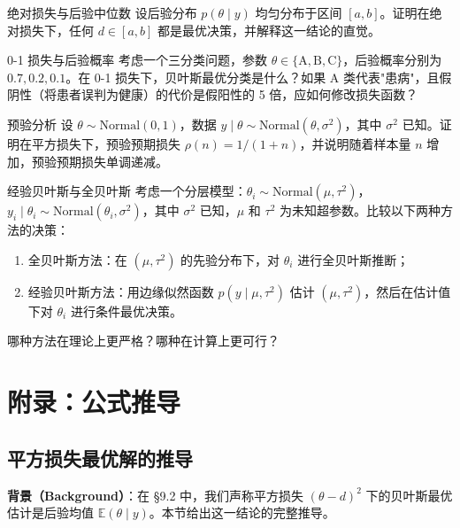 \begin{Exercise}{绝对损失与后验中位数}\label{exr:ch9-2}
设后验分布 $p(\theta \mid y)$ 均匀分布于区间 $[a, b]$。证明在绝对损失下，任何 $d \in [a, b]$ 都是最优决策，并解释这一结论的直觉。
\end{Exercise}

\begin{Exercise}{0-1 损失与后验概率}\label{exr:ch9-3}
考虑一个三分类问题，参数 $\theta \in \{\text{A}, \text{B}, \text{C}\}$，后验概率分别为 $0.7, 0.2, 0.1$。在 0-1 损失下，贝叶斯最优分类是什么？如果 A 类代表"患病"，且假阴性（将患者误判为健康）的代价是假阳性的 5 倍，应如何修改损失函数？
\end{Exercise}

\begin{Exercise}{预验分析}\label{exr:ch9-4}
设 $\theta \sim \text{Normal}(0, 1)$，数据 $y \mid \theta \sim \text{Normal}(\theta, \sigma^2)$，其中 $\sigma^2$ 已知。证明在平方损失下，预验预期损失 $\rho(n) = 1 / (1 + n)$，并说明随着样本量 $n$ 增加，预验预期损失单调递减。
\end{Exercise}

\begin{Exercise}{经验贝叶斯与全贝叶斯}\label{exr:ch9-5}
考虑一个分层模型：$\theta_i \sim \text{Normal}(\mu, \tau^2)$，$y_i \mid \theta_i \sim \text{Normal}(\theta_i, \sigma^2)$，其中 $\sigma^2$ 已知，$\mu$ 和 $\tau^2$ 为未知超参数。比较以下两种方法的决策：
\begin{enumerate}
  \item 全贝叶斯方法：在 $(\mu, \tau^2)$ 的先验分布下，对 $\theta_i$ 进行全贝叶斯推断；
  \item 经验贝叶斯方法：用边缘似然函数 $p(y \mid \mu, \tau^2)$ 估计 $(\mu, \tau^2)$，然后在估计值下对 $\theta_i$ 进行条件最优决策。
\end{enumerate}
哪种方法在理论上更严格？哪种在计算上更可行？
\end{Exercise}

\section{附录：公式推导}\label{sec:appendix-ch9}

\subsection{平方损失最优解的推导}\label{sec:derivation-squared-loss}

\textbf{背景（Background）}：在 \S 9.2 中，我们声称平方损失 $(\theta - d)^2$ 下的贝叶斯最优估计是后验均值 $\mathbb{E}(\theta \mid y)$。本节给出这一结论的完整推导。

